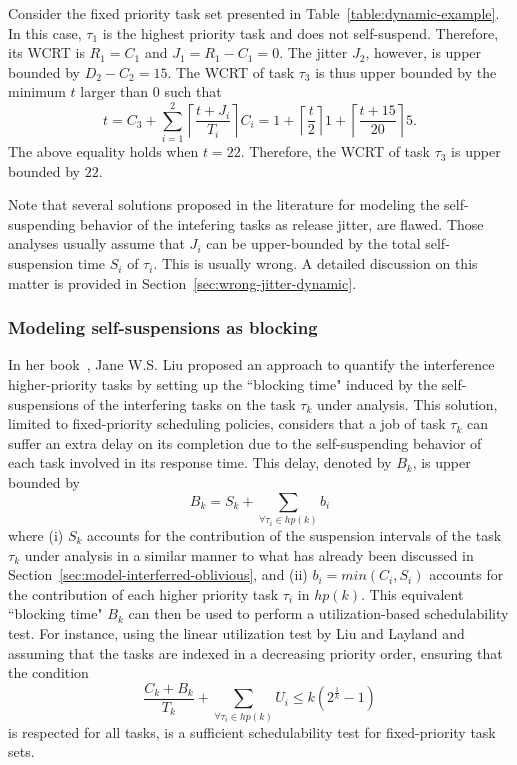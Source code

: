 \begin{example}
\label{ex:suspension-jitter}    
Consider the fixed priority task set presented in Table~\ref{table:dynamic-example}. In this case, $\tau_1$ is the highest priority task and does not self-suspend. Therefore, its WCRT is $R_1 = C_1$ and $J_1 = R_1 - C_1 = 0$. The jitter $J_2$, however, is upper bounded by $D_2 - C_2 =15$. The WCRT of task $\tau_3$ is thus upper bounded by the minimum $t$ larger than $0$ such that 
$$t=C_3+ \sum_{i=1}^2\left\lceil \frac{t + J_i}{T_i} \right\rceil C_i = 1+\left\lceil \frac{t}{2} \right\rceil 1 +\left\lceil \frac{t+15}{20} \right\rceil 5.$$ 
The above equality holds when $t=22$. Therefore, the WCRT of task $\tau_{3}$ is upper bounded by $22$.
\hfill\myendproof  
\end{example}

Note that several solutions proposed in the literature \cite{ECRTS-AudsleyB04,RTAS-AudsleyB04,RTCSA-KimCPKH95} for modeling the 
self-suspending behavior of the intefering tasks as release jitter, are flawed. Those analyses usually assume that $J_i$ can be 
upper-bounded by the total self-suspension time $S_i$ of $\tau_i$. This is usually wrong. A detailed discussion on this matter is 
provided in Section~\ref{sec:wrong-jitter-dynamic}. 

\subsubsection{Modeling self-suspensions as blocking}
\label{sec:model-interfering-blocking}

In her book~\cite[Pages 164-165]{Liu:2000:RS:518501}, Jane W.S. Liu proposed an approach to quantify the interference
higher-priority tasks by setting up the ``blocking time" induced by the self-suspensions of the interfering tasks on the 
task $\tau_k$ under analysis. This solution, limited to fixed-priority scheduling policies, considers that a job of 
task $\tau_k$ can suffer an extra delay on its completion due to the self-suspending behavior of each task involved in its 
response time. This delay, denoted by $B_k$, is upper bounded by 
\begin{equation*}
B_k=S_k+\sum_{\forall \tau_i \in hp(k)} b_i
\end{equation*}
where (i) $S_k$ accounts for the contribution of the suspension intervals of the task $\tau_k$ under analysis in a similar manner to 
what has already been discussed in Section~\ref{sec:model-interferred-oblivious}, and (ii) $b_i=min(C_i, S_i)$ accounts for the contribution of each higher priority task $\tau_i$ in $hp(k)$. This equivalent ``blocking time" $B_k$ can then be used to perform a utilization-based schedulability test. For instance, using the linear utilization test by Liu and Layland \cite{Liu_1973} and assuming that the tasks are indexed in a decreasing priority order, ensuring that the condition
\begin{equation*}
\frac{C_k+B_k}{T_k} + \sum_{\forall \tau_i \in hp(k)} U_i \leq k (2^{\frac{1}{k}}-1)
\end{equation*}
is respected for all tasks, is a sufficient schedulability test for fixed-priority task sets.

